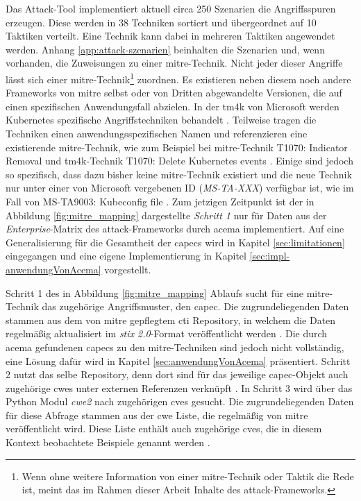 \par Das Attack-Tool implementiert aktuell circa 250 Szenarien die Angriffsspuren erzeugen. Diese werden in 38 Techniken sortiert und übergeordnet auf 10 Taktiken verteilt. Eine Technik kann dabei in mehreren Taktiken angewendet werden. Anhang \ref{app:attack-szenarien} beinhalten die Szenarien und, wenn vorhanden, die Zuweisungen zu einer \gls{mitre}-Technik. Nicht jeder dieser Angriffe lässt sich einer \gls{mitre}-Technik\footnote{Wenn ohne weitere Information von einer \gls{mitre}-Technik oder Taktik die Rede ist, meint das im Rahmen dieser Arbeit Inhalte des \gls{attack}-Frameworks.} zuordnen. Es existieren neben diesem noch andere Frameworks von \gls{mitre} selbst oder von Dritten abgewandelte Versionen, die auf einen spezifischen Anwendungsfall abzielen. In der \glqq{}\gls{tm4k}\grqq{} von Microsoft werden Kubernetes spezifische Angriffstechniken behandelt \autocite{TacticsThreatMatrix}. Teilweise tragen die Techniken einen anwendungsspezifischen Namen und referenzieren eine existierende \gls{mitre}-Technik, wie zum Beispiel bei \gls{mitre}-Technik \glqq{}T1070: Indicator Removal\grqq{} und \gls{tm4k}-Technik \glqq{}T1070: Delete Kubernetes events\grqq{} \autocite{IndicatorRemovalTechnique} \autocite{DeleteKubernetesEvents}. Einige sind jedoch so spezifisch, dass dazu bisher keine \gls{mitre}-Technik existiert und die neue Technik nur unter einer von Microsoft vergebenen ID (\textit{MS-TA-XXX}) verfügbar ist, wie im Fall von \glqq{}MS-TA9003: Kubeconfig file\grqq{} \autocite{KubeconfigFileThreat}. Zum jetzigen Zeitpunkt ist der in Abbildung \ref{fig:mitre_mapping} dargestellte \textit{Schritt 1} nur für Daten aus der \textit{Enterprise}-Matrix des \gls{attack}-Frameworks durch \gls{acema} implementiert. Auf eine Generalisierung für die Gesamtheit der \glspl{capec} wird in Kapitel \ref{sec:limitationen} eingegangen und eine eigene Implementierung in Kapitel \ref{sec:impl-anwendungVonAcema} vorgestellt.
\par Schritt 1 des in Abbildung \ref{fig:mitre_mapping} Ablaufs sucht für eine \gls{mitre}-Technik das zugehörige Angriffsmuster, den \gls{capec}. Die zugrundeliegenden Daten stammen aus dem von \gls{mitre} gepflegtem \gls{cti} Repository, in welchem die Daten regelmäßig aktualisiert im \textit{\gls{stix} 2.0}-Format veröffentlicht werden \autocite{IntroductionSTIX} \autocite{MitreCtiCyber}. Die durch \gls{acema} gefundenen \glspl{capec} zu den \gls{mitre}-Techniken sind jedoch nicht vollständig, eine Lösung dafür wird in Kapitel \ref{sec:anwendungVonAcema} präsentiert. Schritt 2 nutzt das selbe Repository, denn dort sind für das jeweilige \gls{capec}-Objekt auch zugehörige \glspl{cwe} unter externen Referenzen verknüpft \autocite{CtiUSAGEmdMaster}. In Schritt 3 wird über das Python Modul \textit{cwe2} nach zugehörigen \glspl{cve} gesucht. Die zugrundeliegenden Daten für diese Abfrage stammen aus der \gls{cwe} Liste, die regelmäßig von \gls{mitre} veröffentlicht wird. Diese Liste enthält auch zugehörige \glspl{cve}, die in diesem Kontext \glqq{}beobachtete Beispiele\grqq{} genannt werden \autocite{AboutcodeorgCwe22024} \autocite{CWEDownloads}.
